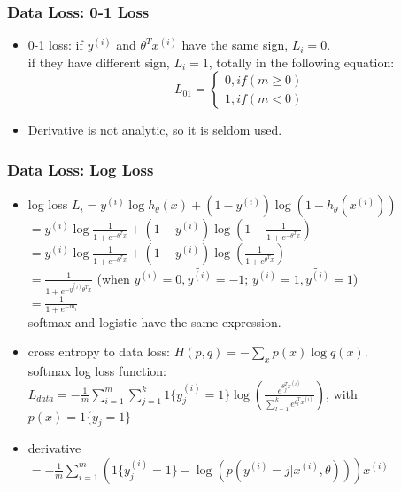 \begin{frame}
\frametitle{Data Loss: 0-1 Loss}
	\small
	\begin{itemize}
		\item 0-1 loss: if $y^{(i)}$ and $\theta^Tx^{(i)}$ have the same sign, $L_i=0$.\\
			\hspace{1cm}if they have different sign, $L_i=1$, totally in the following equation:\\
				\begin{equation}
					L_{01}=
					\left\{
						\begin{aligned}
							0, if(m\geq 0)\\
							1, if(m < 0)
						\end{aligned}
					\right.
				\end{equation}
		\item Derivative is not analytic, so it is seldom used.
	\end{itemize}
\end{frame}
\begin{frame}
\frametitle{Data Loss: Log Loss}
	\small
	\begin{itemize}
		\item log loss
			$L_i=y^{(i)}\log h_{\theta}(x)+{(1-y^{(i)})}\log (1-h_{\theta}(x^{(i)}))$\\
				\hspace{1cm}$=y^{(i)}\log \frac{1}{1+e^{-\theta ^T x}}+{(1-y^{(i)})}\log (1-\frac{1}{1+e^{-\theta ^T x}})$\\
				\hspace{1cm}$=y^{(i)}\log \frac{1}{1+e^{-\theta ^T x}}+{(1-y^{(i)})}\log (\frac{1}{1+e^{\theta ^T x}})$\\
				\hspace{1cm}$=\frac{1}{1+e^{-\widetilde{y^{(i)}}\theta ^T x}}$
				\hspace{1cm} (when $y^{(i)}=0, \widetilde{y^{(i)}}=-1$; $y^{(i)}=1, \widetilde{y^{(i)}}=1$)	\\
				\hspace{1cm}$=\frac{1}{1+e^{-m_i}}$\\
				\hspace{1cm} softmax and logistic have the same expression.
		\item cross entropy to data loss: $H(p,q)=-\sum_x p(x)\log q(x)$.\\
			softmax	log loss function: 
			$L_{data}=-\frac{1}{m}\sum_{i=1}^{m}\sum_{j=1}^{k}1\{y_j^{(i)}=1\}\log({\frac{e^{\theta_j^Tx^{(i)}}}{\sum_{l=1}^{k} e^{\theta_l ^T x^{(i)}}}})$, with $p(x)=1\{y_j=1\}$ \\
		\item derivative\\
		\hspace{0cm}$=-\frac{1}{m}\sum_{i=1}^{m}
						(
							{1\{y_j^{(i)}=1\}}
								-\log (p(y^{(i)}=j|x^{(i)},\theta))
						){x^{(i)}}$\\
	\end{itemize}
\end{frame}
